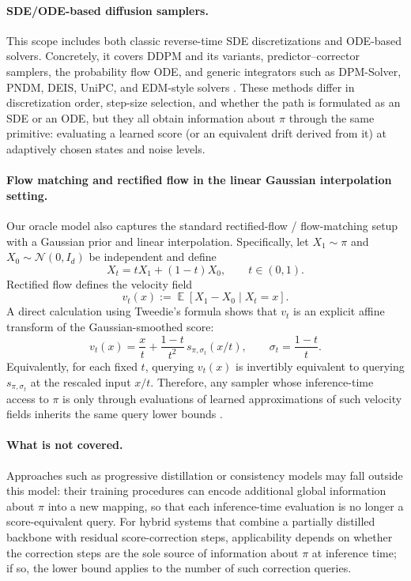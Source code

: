 \documentclass[11pt,letterpaper]{article}
\DeclareMathOperator*{\E}{\mathbb{E}}
\newcommand{\1}{\mathbbm{1}}
\begin{document}
\paragraph{SDE/ODE-based diffusion samplers.}
This scope includes both classic reverse-time SDE discretizations and ODE-based solvers.
Concretely, it covers DDPM and its variants, predictor--corrector samplers, the probability flow ODE,
and generic integrators such as DPM-Solver, PNDM, DEIS, UniPC, and EDM-style solvers
\citep{song2021score_sde,lu2022dpmsolver,lu2022dpmsolverpp,liu2022pndm,zhang2022deis,zhao2023unipc,karras2022edm}.
These methods differ in discretization order, step-size selection, and whether the path is formulated
as an SDE or an ODE, but they all obtain information about $\pi$ through the same primitive:
evaluating a learned score (or an equivalent drift derived from it) at adaptively chosen states and noise levels.

\paragraph{Flow matching and rectified flow in the linear Gaussian interpolation setting.}
Our oracle model also captures the standard rectified-flow / flow-matching setup with a Gaussian prior
and linear interpolation. Specifically, let $X_1\sim \pi$ and $X_0\sim\mathcal N(0,I_d)$ be independent and define
\[
  X_t = tX_1 + (1-t)X_0,\qquad t\in(0,1).
\]
Rectified flow defines the velocity field
\[
  v_t(x) := \E[X_1-X_0 \mid X_t=x].
\]
A direct calculation using Tweedie's formula \citep{robbins1956empirical,efron2011tweedie} shows that
$v_t$ is an explicit affine transform of the Gaussian-smoothed score:
\[
  v_t(x)=\frac{x}{t}+\frac{1-t}{t^2}\, s_{\pi,\sigma_t}(x/t),
  \qquad \sigma_t=\frac{1-t}{t}.
\]
Equivalently, for each fixed $t$, querying $v_t(x)$ is invertibly equivalent to querying
$s_{\pi,\sigma_t}$ at the rescaled input $x/t$. Therefore, any sampler whose inference-time access to $\pi$
is only through evaluations of learned approximations of such velocity fields inherits the same query lower bounds
\citep{lipman2022flowmatching,liu2022rectified, benton2023error, fukumizu2025flow}.


\paragraph{What is not covered.}
Approaches such as progressive distillation
\citep{salimans2022progressive} or consistency
models \citep{song2023consistency} may fall outside this model:
their training procedures can encode additional global information
about $\pi$ into a new mapping, so that each inference-time
evaluation is no longer a score-equivalent query.
For hybrid systems that combine a partially distilled backbone
with residual score-correction steps, applicability depends on
whether the correction steps are the sole source of information
about $\pi$ at inference time; if so, the lower bound applies to
the number of such correction queries.
\end{document}
